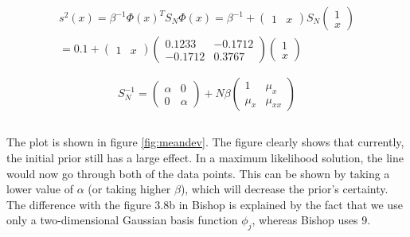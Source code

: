 \documentclass{article}
\begin{document}
\begin{equation}
\begin{split}
    s^2(x) = \beta^{-1} \Phi(x)^T S_N \Phi(x) = \beta^{-1} +
    \begin{pmatrix}
        1 & x
    \end{pmatrix}
    S_N
    \begin{pmatrix}
        1 \\ x
    \end{pmatrix} \\
    = 0.1 +
    \begin{pmatrix}
        1 & x
    \end{pmatrix}
    \begin{pmatrix}
        0.1233 & -0.1712 \\
        -0.1712 & 0.3767
    \end{pmatrix}
    \begin{pmatrix}
        1 \\ x
    \end{pmatrix}
\end{split}
\end{equation}

\begin{equation}
    S_N^{-1} =
    \begin{pmatrix}
        \alpha & 0 \\
        0 & \alpha
    \end{pmatrix}
    + N \beta 
    \begin{pmatrix}
        1 & \mu_x \\
        \mu_x & \mu_{xx}
    \end{pmatrix}
\end{equation}

\subsection{}
The plot is shown in figure \ref{fig:meandev}. The figure clearly shows that currently, the initial prior still has a large effect. In a maximum likelihood solution, the line would now go through both of the data points. This can be shown by taking a lower value of $\alpha$ (or taking higher $\beta$), which will decrease the prior's certainty. The difference with the figure 3.8b in Bishop is explained by the fact that we use only a two-dimensional Gaussian basis function $\phi_j$, whereas Bishop uses 9.
\end{document}
